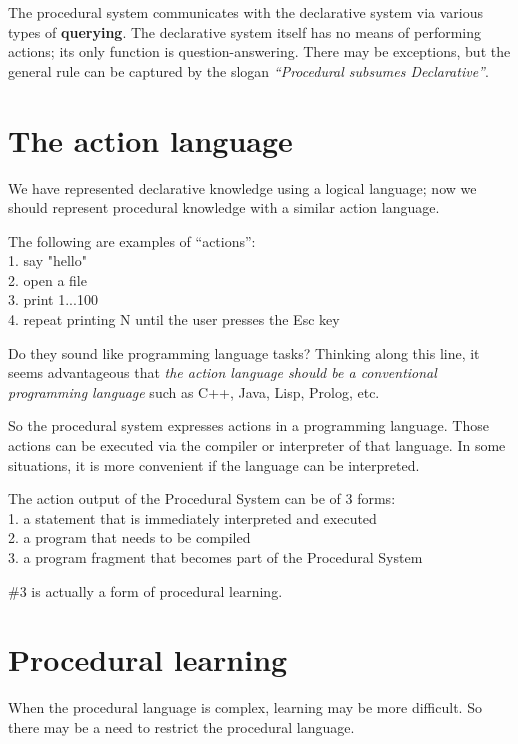 \documentclass[a4paper]{report}
\begin{document}
The procedural system communicates with the declarative system via various types of \textbf{querying}.  The declarative system itself has no means of performing actions;  its only function is question-answering.  There may be exceptions, but the general rule can be captured by the slogan \textit{``Procedural subsumes Declarative''}.

\section{The action language}
\label{sec:ActionLanguage}

We have represented declarative knowledge using a logical language; now we should represent procedural knowledge with a similar action language.

The following are examples of ``actions'':\\
1. say "hello"\\
2. open a file\\
3. print 1...100\\
4. repeat printing N until the user presses the Esc key

Do they sound like programming language tasks?  Thinking along this line, it seems advantageous that \textit{the action language should be a conventional programming language} such as C++, Java, Lisp,  Prolog, etc.

So the procedural system expresses actions in a programming language.  Those actions can be executed via the compiler or interpreter of that language.  In some situations, it is more convenient if the language can be interpreted.

The action output of the Procedural System can be of 3 forms:\\
1. a statement that is immediately interpreted and executed\\
2. a program that needs to be compiled\\
3. a program fragment that becomes part of the Procedural System

\#3 is actually a form of procedural learning.

\section{Procedural learning}
\label{sec:ProceduralLearning}

When the procedural language is complex, learning may be more difficult.  So there may be a need to restrict the procedural language.  %
\end{document}
